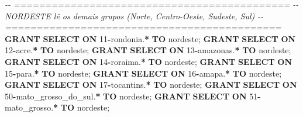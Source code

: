 \documentclass[
]{book}
\newenvironment{Shaded}{\begin{snugshade}}{\end{snugshade}}
\newcommand{\CommentTok}[1]{\textcolor[rgb]{0.56,0.35,0.01}{\textit{#1}}}
\newcommand{\DecValTok}[1]{\textcolor[rgb]{0.00,0.00,0.81}{#1}}
\newcommand{\KeywordTok}[1]{\textcolor[rgb]{0.13,0.29,0.53}{\textbf{#1}}}
\newcommand{\NormalTok}[1]{#1}
\newcommand{\OperatorTok}[1]{\textcolor[rgb]{0.81,0.36,0.00}{\textbf{#1}}}
\newcommand{\StringTok}[1]{\textcolor[rgb]{0.31,0.60,0.02}{#1}}
\begin{document}
\begin{Shaded}
\begin{Highlighting}[]
\CommentTok{{-}{-} ============================================}
\CommentTok{{-}{-} NORDESTE lê os demais grupos (Norte, Centro{-}Oeste, Sudeste, Sul)}
\CommentTok{{-}{-} ============================================}
\KeywordTok{GRANT} \KeywordTok{SELECT} \KeywordTok{ON}\NormalTok{ \textasciigrave{}}\DecValTok{11}\OperatorTok{{-}}\NormalTok{rondonia\textasciigrave{}.}\OperatorTok{*}           \KeywordTok{TO} \StringTok{\textquotesingle{}nordeste\textquotesingle{}}\NormalTok{;}
\KeywordTok{GRANT} \KeywordTok{SELECT} \KeywordTok{ON}\NormalTok{ \textasciigrave{}}\DecValTok{12}\OperatorTok{{-}}\NormalTok{acre\textasciigrave{}.}\OperatorTok{*}               \KeywordTok{TO} \StringTok{\textquotesingle{}nordeste\textquotesingle{}}\NormalTok{;}
\KeywordTok{GRANT} \KeywordTok{SELECT} \KeywordTok{ON}\NormalTok{ \textasciigrave{}}\DecValTok{13}\OperatorTok{{-}}\NormalTok{amazonas\textasciigrave{}.}\OperatorTok{*}           \KeywordTok{TO} \StringTok{\textquotesingle{}nordeste\textquotesingle{}}\NormalTok{;}
\KeywordTok{GRANT} \KeywordTok{SELECT} \KeywordTok{ON}\NormalTok{ \textasciigrave{}}\DecValTok{14}\OperatorTok{{-}}\NormalTok{roraima\textasciigrave{}.}\OperatorTok{*}            \KeywordTok{TO} \StringTok{\textquotesingle{}nordeste\textquotesingle{}}\NormalTok{;}
\KeywordTok{GRANT} \KeywordTok{SELECT} \KeywordTok{ON}\NormalTok{ \textasciigrave{}}\DecValTok{15}\OperatorTok{{-}}\NormalTok{para\textasciigrave{}.}\OperatorTok{*}               \KeywordTok{TO} \StringTok{\textquotesingle{}nordeste\textquotesingle{}}\NormalTok{;}
\KeywordTok{GRANT} \KeywordTok{SELECT} \KeywordTok{ON}\NormalTok{ \textasciigrave{}}\DecValTok{16}\OperatorTok{{-}}\NormalTok{amapa\textasciigrave{}.}\OperatorTok{*}              \KeywordTok{TO} \StringTok{\textquotesingle{}nordeste\textquotesingle{}}\NormalTok{;}
\KeywordTok{GRANT} \KeywordTok{SELECT} \KeywordTok{ON}\NormalTok{ \textasciigrave{}}\DecValTok{17}\OperatorTok{{-}}\NormalTok{tocantins\textasciigrave{}.}\OperatorTok{*}          \KeywordTok{TO} \StringTok{\textquotesingle{}nordeste\textquotesingle{}}\NormalTok{;}
\KeywordTok{GRANT} \KeywordTok{SELECT} \KeywordTok{ON}\NormalTok{ \textasciigrave{}}\DecValTok{50}\OperatorTok{{-}}\NormalTok{mato\_grosso\_do\_sul\textasciigrave{}.}\OperatorTok{*} \KeywordTok{TO} \StringTok{\textquotesingle{}nordeste\textquotesingle{}}\NormalTok{;}
\KeywordTok{GRANT} \KeywordTok{SELECT} \KeywordTok{ON}\NormalTok{ \textasciigrave{}}\DecValTok{51}\OperatorTok{{-}}\NormalTok{mato\_grosso\textasciigrave{}.}\OperatorTok{*}       \KeywordTok{TO} \StringTok{\textquotesingle{}nordeste\textquotesingle{}}\NormalTok{;}

\end{Highlighting}
\end{Shaded}
\end{document}
